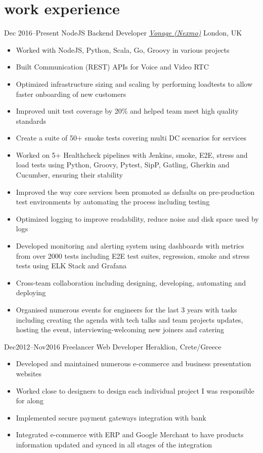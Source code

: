 \section{\normalfont work experience}
\vspace{-.1cm}
\begin{entrylist}
\entry
{Dec 2016--Present}
{NodeJS Backend Developer {\normalfont \emph{\href{https://www.vonage.co.uk/}{Vonage (Nexmo)}}}}
{London, UK}
\vspace{-0.6cm}
\begin{itemize}[leftmargin=.6cm]
	\item Worked with NodeJS, Python, Scala, Go, Groovy in various projects
	\item Built Communication (REST) APIs for Voice and Video RTC
	\item Optimized infrastructure sizing and scaling by performing loadtests to allow faster onboarding of new customers
	\item Improved unit test coverage by 20\% and helped team meet high quality standards
	\item Create a suite of 50+ smoke tests covering multi DC scenarios for services
	\item Worked on 5+ Healthcheck pipelines with Jenkins, smoke, E2E, stress and load tests using Python, Groovy, Pytest, SipP, Gatling, Gherkin and Cucumber, ensuring their stability
	\item Improved the way core services been promoted as defaults on pre-production test environments by automating the process including testing
	\item Optimized logging to improve readability, reduce noise and disk space used by logs
	\item Developed monitoring and alerting system using dashboards with metrics from over 2000 tests including E2E test suites, regression, smoke and stress tests using ELK Stack and Grafana
	\item Cross-team collaboration including designing, developing, automating and deploying
	\item Organised numerous events for engineers for the last 3 years with tasks including creating the agenda with tech talks and team projects updates, hosting the event, interviewing-welcoming new joiners and catering
\end{itemize}

\entry
{Dec2012–Nov2016}
{Freelancer Web Developer}
{Heraklion, Crete/Greece}
\vspace{-0.6cm}
\begin{itemize}[leftmargin=.6cm]
	\item Developed and maintained numerous e-commerce and business presentation websites
	\item Worked close to designers to design each individual project I was responsible for along
	\item Implemented secure payment gateways integration with bank
	\item Integrated e-commerce with ERP and Google Merchant to have products information updated and synced in all stages of the integration
\end{itemize}


\end{entrylist}
